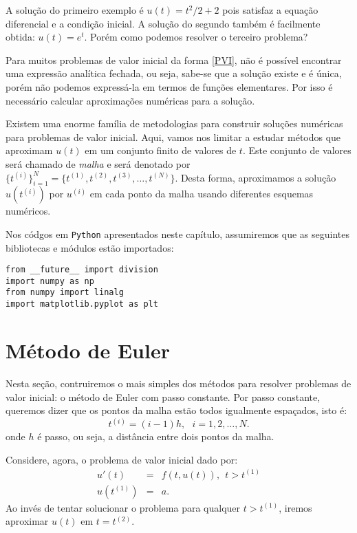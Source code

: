 A solução do primeiro exemplo é $u(t)=t^2/2+2$ pois satisfaz a equação diferencial e a condição inicial. A solução do segundo também é facilmente obtida: $u(t)=e^t$. Porém como podemos resolver o terceiro problema?

Para muitos problemas de valor inicial da forma \eqref{PVI}, não é possível encontrar uma expressão analítica fechada, ou seja, sabe-se que a solução existe e é única, porém não podemos expressá-la em termos de funções elementares. Por isso é necessário calcular aproximações numéricas para a solução. 

Existem uma enorme família de metodologias para construir soluções numéricas para problemas de valor inicial. Aqui, vamos nos limitar a estudar métodos que aproximam $u(t)$ em um conjunto finito de valores de $t$. Este conjunto de valores será chamado de \emph{malha} e será denotado por  $\{t^{(i)}\}_{i=1}^N=\{t^{(1)}, t^{(2)}, t^{(3)},\ldots, t^{(N)}\}$. Desta forma, aproximamos a solução $u(t^{(i)})$ por $u^{(i)}$ em cada ponto da malha usando diferentes esquemas numéricos.

\ifispython
Nos códgos em \verb+Python+ apresentados neste capítulo, assumiremos que as seguintes bibliotecas e módulos estão importados:
\begin{verbatim}
from __future__ import division
import numpy as np
from numpy import linalg
import matplotlib.pyplot as plt
\end{verbatim}
\fi


\section{Método de Euler}\label{pvi:euler}
Nesta seção, contruiremos o mais simples dos métodos para resolver problemas de valor inicial: o método de Euler com passo constante. Por passo constante, queremos dizer que os pontos da malha estão todos igualmente espaçados, isto é:
$$t^{(i)}=(i-1)h,~~~i=1,2,\ldots,N.$$
onde $h$ é passo, ou seja, a distância entre dois pontos da malha.

Considere, agora, o problema de valor inicial dado por:
\begin{eqnarray}\label{EDO1}
  u'(t)  &=& f(t,u(t)),~~t>t^{(1)} \\
  u(t^{(1)}) &=& a.
\end{eqnarray}
Ao invés de tentar solucionar o problema para qualquer $t>t^{(1)}$, iremos aproximar $u(t)$ em $t=t^{(2)}$.

